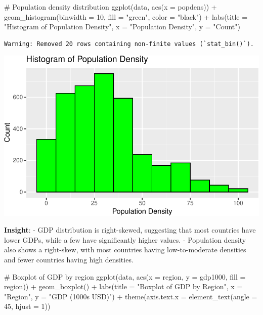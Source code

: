 \documentclass[
  letterpaper,
  DIV=11,
  numbers=noendperiod]{scrartcl}
\newenvironment{Shaded}{\begin{snugshade}}{\end{snugshade}}
\newcommand{\AttributeTok}[1]{\textcolor[rgb]{0.40,0.45,0.13}{#1}}
\newcommand{\CommentTok}[1]{\textcolor[rgb]{0.37,0.37,0.37}{#1}}
\newcommand{\DecValTok}[1]{\textcolor[rgb]{0.68,0.00,0.00}{#1}}
\newcommand{\FunctionTok}[1]{\textcolor[rgb]{0.28,0.35,0.67}{#1}}
\newcommand{\NormalTok}[1]{\textcolor[rgb]{0.00,0.23,0.31}{#1}}
\newcommand{\SpecialCharTok}[1]{\textcolor[rgb]{0.37,0.37,0.37}{#1}}
\newcommand{\StringTok}[1]{\textcolor[rgb]{0.13,0.47,0.30}{#1}}
\begin{document}
\begin{Shaded}
\begin{Highlighting}[]
\CommentTok{\# Population density distribution}
\FunctionTok{ggplot}\NormalTok{(data, }\FunctionTok{aes}\NormalTok{(}\AttributeTok{x =}\NormalTok{ popdens)) }\SpecialCharTok{+} 
  \FunctionTok{geom\_histogram}\NormalTok{(}\AttributeTok{binwidth =} \DecValTok{10}\NormalTok{, }\AttributeTok{fill =} \StringTok{"green"}\NormalTok{, }\AttributeTok{color =} \StringTok{"black"}\NormalTok{) }\SpecialCharTok{+}
  \FunctionTok{labs}\NormalTok{(}\AttributeTok{title =} \StringTok{"Histogram of Population Density"}\NormalTok{, }\AttributeTok{x =} \StringTok{"Population Density"}\NormalTok{, }\AttributeTok{y =} \StringTok{"Count"}\NormalTok{)}
\end{Highlighting}
\end{Shaded}

\begin{verbatim}
Warning: Removed 20 rows containing non-finite values (`stat_bin()`).
\end{verbatim}

\includegraphics{EDA_files/figure-pdf/unnamed-chunk-4-2.pdf}

\textbf{Insight}: - GDP distribution is right-skewed, suggesting that
most countries have lower GDPs, while a few have significantly higher
values. - Population density also shows a right-skew, with most
countries having low-to-moderate densities and fewer countries having
high densities.

\begin{Shaded}
\begin{Highlighting}[]
\CommentTok{\# Boxplot of GDP by region}
\FunctionTok{ggplot}\NormalTok{(data, }\FunctionTok{aes}\NormalTok{(}\AttributeTok{x =}\NormalTok{ region, }\AttributeTok{y =}\NormalTok{ gdp1000, }\AttributeTok{fill =}\NormalTok{ region)) }\SpecialCharTok{+}
  \FunctionTok{geom\_boxplot}\NormalTok{() }\SpecialCharTok{+}
  \FunctionTok{labs}\NormalTok{(}\AttributeTok{title =} \StringTok{"Boxplot of GDP by Region"}\NormalTok{, }\AttributeTok{x =} \StringTok{"Region"}\NormalTok{, }\AttributeTok{y =} \StringTok{"GDP (1000s USD)"}\NormalTok{) }\SpecialCharTok{+}
  \FunctionTok{theme}\NormalTok{(}\AttributeTok{axis.text.x =} \FunctionTok{element\_text}\NormalTok{(}\AttributeTok{angle =} \DecValTok{45}\NormalTok{, }\AttributeTok{hjust =} \DecValTok{1}\NormalTok{))}
\end{Highlighting}
\end{Shaded}
\end{document}
